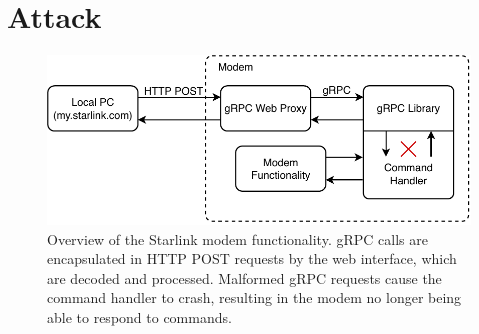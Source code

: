 \section{Attack}\label{sec:attack}

\begin{figure}
    \centering\includegraphics[width=\columnwidth]{img/modem.pdf}
    \caption{Overview of the Starlink modem functionality. gRPC calls are encapsulated in HTTP POST requests by the web interface, which are decoded and processed. Malformed gRPC requests cause the command handler to crash, resulting in the modem no longer being able to respond to commands.}
    \label{fig:modem}
\end{figure}

